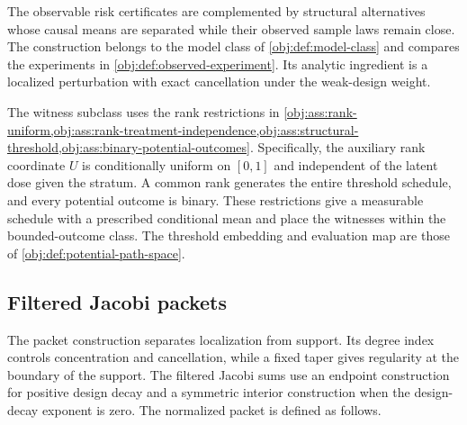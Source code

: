 \documentclass[11pt]{article}
\begin{document}
The observable risk certificates are complemented by structural alternatives whose causal means are separated while their observed sample laws remain close. The construction belongs to the model class of \cref{obj:def:model-class} and compares the experiments in \cref{obj:def:observed-experiment}. Its analytic ingredient is a localized perturbation with exact cancellation under the weak-design weight.

The witness subclass uses the rank restrictions in \cref{obj:ass:rank-uniform,obj:ass:rank-treatment-independence,obj:ass:structural-threshold,obj:ass:binary-potential-outcomes}. Specifically, the auxiliary rank coordinate \(U\) is conditionally uniform on \([0,1]\) and independent of the latent dose given the stratum. A common rank generates the entire threshold schedule, and every potential outcome is binary. These restrictions give a measurable schedule with a prescribed conditional mean and place the witnesses within the bounded-outcome class. The threshold embedding and evaluation map are those of \cref{obj:def:potential-path-space}.

\subsection{Filtered Jacobi packets}

The packet construction separates localization from support. Its degree index  controls concentration and cancellation, while a fixed taper gives regularity at the boundary of the support. The filtered Jacobi sums  use an endpoint construction for positive design decay and a symmetric interior construction when the design-decay exponent is zero. The normalized packet  is defined as follows.
\end{document}
